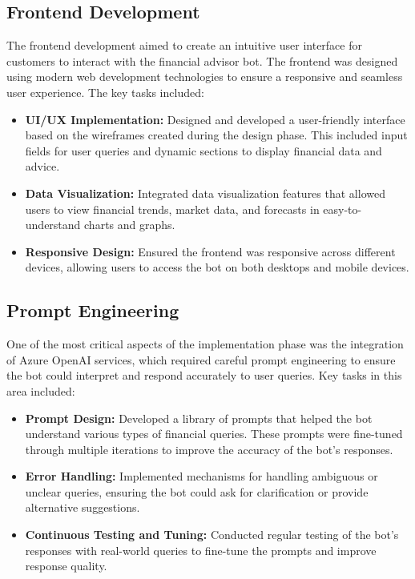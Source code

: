\documentclass[a4paper,12pt]{report}
\begin{document}
\subsection*{Frontend Development}
The frontend development aimed to create an intuitive user interface for customers to interact with the financial advisor bot. The frontend was designed using modern web development technologies to ensure a responsive and seamless user experience. The key tasks included:
\begin{itemize}
    \item \textbf{UI/UX Implementation:} Designed and developed a user-friendly interface based on the wireframes created during the design phase. This included input fields for user queries and dynamic sections to display financial data and advice.
    \item \textbf{Data Visualization:} Integrated data visualization features that allowed users to view financial trends, market data, and forecasts in easy-to-understand charts and graphs.
    \item \textbf{Responsive Design:} Ensured the frontend was responsive across different devices, allowing users to access the bot on both desktops and mobile devices.
\end{itemize}

\subsection*{Prompt Engineering}
One of the most critical aspects of the implementation phase was the integration of Azure OpenAI services, which required careful prompt engineering to ensure the bot could interpret and respond accurately to user queries. Key tasks in this area included:
\begin{itemize}
    \item \textbf{Prompt Design:} Developed a library of prompts that helped the bot understand various types of financial queries. These prompts were fine-tuned through multiple iterations to improve the accuracy of the bot’s responses.
    \item \textbf{Error Handling:} Implemented mechanisms for handling ambiguous or unclear queries, ensuring the bot could ask for clarification or provide alternative suggestions.
    \item \textbf{Continuous Testing and Tuning:} Conducted regular testing of the bot’s responses with real-world queries to fine-tune the prompts and improve response quality.
\end{itemize}
\end{document}

